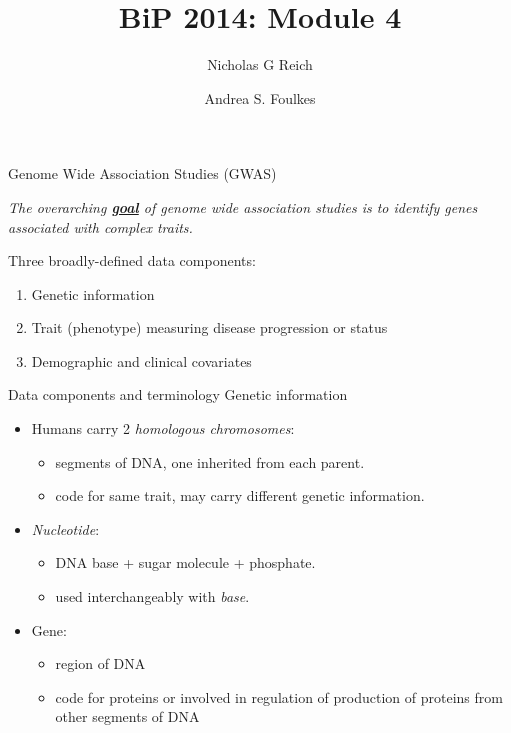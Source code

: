 \documentclass[table]{beamer}\usepackage[]{graphicx}\usepackage[]{color}
\title{}
\author{Nicholas G Reich}
\begin{document}
\title{BiP 2014: Module 4}


\author{Andrea S. Foulkes}


\begin{frame}[plain]
        \titlepage
\end{frame}

\begin{frame}{Genome Wide Association Studies (GWAS)}

\emph{The overarching \underline{\bf goal} of genome wide association studies is to identify genes associated with complex traits.}

\bigskip
Three broadly-defined data components:
\begin{enumerate}
\item Genetic information
\item Trait (phenotype) measuring disease progression or status
\item Demographic and clinical covariates 
\end{enumerate}
\begin{figure}[ht]
\end{figure}
\end{frame}

\begin{frame}{Data components and terminology}
Genetic information
\begin{itemize}
\item Humans carry 2 \emph{homologous chromosomes}:
  \begin{itemize}
	\item segments of DNA, one inherited from each parent.
	\item code for same trait, may carry different genetic information.
	\end{itemize}
\item \emph{Nucleotide}:
	\begin{itemize}
	\item DNA base + sugar molecule + phosphate.
	\item used interchangeably with \emph{base}.
	\end{itemize}
\item Gene:
	\begin{itemize}
	\item region of DNA
	\item code for proteins or involved in regulation of production of proteins from other segments of DNA
	\end{itemize}
\end{itemize}
\end{frame}
	
\end{document}
